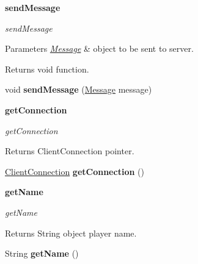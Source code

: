 \begin{Indent}{\bf send\+Message}\par
{\em send\+Message


\begin{DoxyParams}{Parameters}
{\em \hyperlink{classbattleship_1_1game_1_1Message}{Message}} & object to be sent to server. \\
\hline
\end{DoxyParams}
\begin{DoxyReturn}{Returns}
void function. 
\end{DoxyReturn}
}\begin{DoxyCompactItemize}
\item 
\hypertarget{classbattleship_1_1game_1_1Player_a10186b056f15848d299228d1a26b7791}{}void {\bfseries send\+Message} (\hyperlink{classbattleship_1_1game_1_1Message}{Message} message)\label{classbattleship_1_1game_1_1Player_a10186b056f15848d299228d1a26b7791}

\end{DoxyCompactItemize}
\end{Indent}
\begin{Indent}{\bf get\+Connection}\par
{\em get\+Connection

\begin{DoxyReturn}{Returns}
Client\+Connection pointer. 
\end{DoxyReturn}
}\begin{DoxyCompactItemize}
\item 
\hypertarget{classbattleship_1_1game_1_1Player_aeca7262ad339a9af21a89556697123c9}{}\hyperlink{classbattleship_1_1network_1_1ClientConnection}{Client\+Connection} {\bfseries get\+Connection} ()\label{classbattleship_1_1game_1_1Player_aeca7262ad339a9af21a89556697123c9}

\end{DoxyCompactItemize}
\end{Indent}
\begin{Indent}{\bf get\+Name}\par
{\em get\+Name

\begin{DoxyReturn}{Returns}
String object player name. 
\end{DoxyReturn}
}\begin{DoxyCompactItemize}
\item 
\hypertarget{classbattleship_1_1game_1_1Player_a51d55c2a810ffd57f4260c6df4277ff0}{}String {\bfseries get\+Name} ()\label{classbattleship_1_1game_1_1Player_a51d55c2a810ffd57f4260c6df4277ff0}

\end{DoxyCompactItemize}
\end{Indent}
